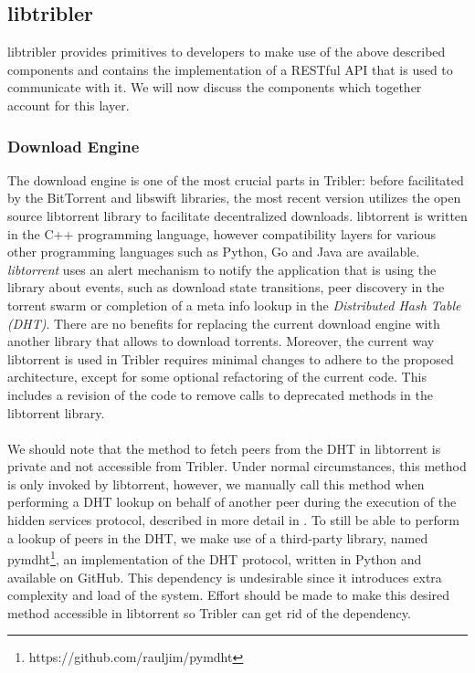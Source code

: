 \subsection{libtribler}
libtribler provides primitives to developers to make use of the above described components and contains the implementation of a RESTful API that is used to communicate with it. We will now discuss the components which together account for this layer.

\subsubsection{\textbf{Download Engine}}
The download engine is one of the most crucial parts in Tribler: before facilitated by the BitTorrent and libswift libraries, the most recent version utilizes the open source libtorrent library to facilitate decentralized downloads. libtorrent is written in the C++ programming language, however compatibility layers for various other programming languages such as Python, Go and Java are available. \emph{libtorrent} uses an alert mechanism to notify the application that is using the library about events, such as download state transitions, peer discovery in the torrent swarm or completion of a meta info lookup in the \emph{Distributed Hash Table (DHT)}. There are no benefits for replacing the current download engine with another library that allows to download torrents. Moreover, the current way libtorrent is used in Tribler requires minimal changes to adhere to the proposed architecture, except for some optional refactoring of the current code. This includes a revision of the code to remove calls to deprecated methods in the libtorrent library.\\\\
We should note that the method to fetch peers from the DHT in libtorrent is private and not accessible from Tribler. Under normal circumstances, this method is only invoked by libtorrent, however, we manually call this method when performing a DHT lookup on behalf of another peer during the execution of the hidden services protocol, described in more detail in \cite{ruigrok2015bittorrent}. To still be able to perform a lookup of peers in the DHT, we make use of a third-party library, named pymdht\footnote{https://github.com/rauljim/pymdht}, an implementation of the DHT protocol, written in Python and available on GitHub. This dependency is undesirable since it introduces extra complexity and load of the system. Effort should be made to make this desired method accessible in libtorrent so Tribler can get rid of the dependency.


